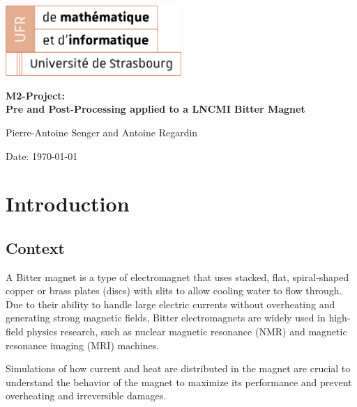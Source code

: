 \documentclass[12pt]{article}
\begin{document}
\begin{titlepage}
\centering
\includegraphics[width=0.5\textwidth]{images/logo-ufr.png}\par\vspace{1cm}
\vspace{1.5cm}
{\huge\bfseries M2-Project: \\
Pre and Post-Processing applied to a LNCMI Bitter Magnet\par}
\vspace{2cm}
{\Large Pierre-Antoine Senger and Antoine Regardin\par}
\vfill


\vfill

{\large Date: \today\par}
\end{titlepage}

\tableofcontents

\newpage

\section{Introduction}

\subsection{Context}
A Bitter magnet is a type of electromagnet that uses stacked, flat, spiral-shaped 
copper or brass plates (discs) with slits to allow cooling water to flow through. 
Due to their ability to handle large electric currents without overheating and
generating strong magnetic fields, Bitter electromagnets are widely used in
high-field physics research, such as nuclear magnetic resonance (NMR) and magnetic
resonance imaging (MRI) machines.

Simulations of how current and heat are distributed in the magnet are crucial to
understand the behavior of the magnet to maximize its performance and prevent
overheating and irreversible damages.
\end{document}
